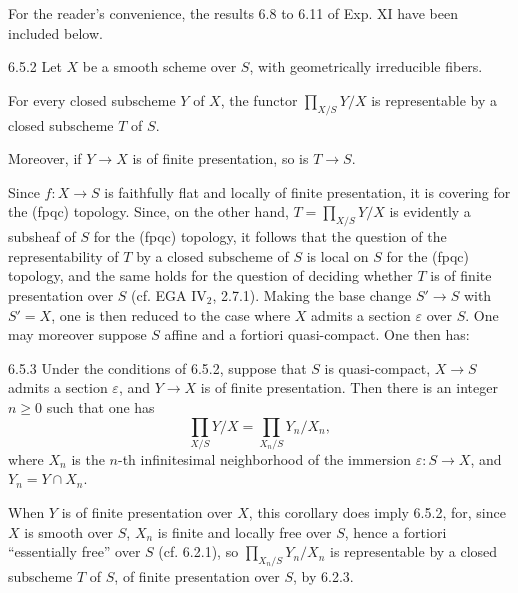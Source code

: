 For the reader's convenience, the results 6.8 to 6.11 of Exp. XI have been included below.
\begin{theorem}{6.5.2}\label{VIB.6.5.2}
Let $X$ be a smooth scheme over $S$, with geometrically irreducible fibers.
\begin{enumeratei}
\item For every closed subscheme $Y$ of $X$, the functor $\prod_{X/S}Y/X$ is representable by a closed subscheme $T$ of $S$.
\item Moreover, if $Y\to X$ is of finite presentation, so is $T\to S$.
\end{enumeratei}
\end{theorem}
Since $f:X\to S$ is faithfully flat and locally of finite presentation, it is covering for the (fpqc) topology. Since, on the other hand, $T=\prod_{X/S}Y/X$ is evidently a subsheaf of $S$ for the (fpqc) topology, it follows that the question of the representability of $T$ by a closed subscheme of $S$ is local on $S$ for the (fpqc) topology, and the same holds for the question of deciding whether $T$ is of finite presentation over $S$ (cf. EGA IV$_2$, 2.7.1). Making the base change $S'\to S$ with $S'=X$, one is then reduced to the case where $X$ admits a section $\varepsilon$ over $S$. One may moreover suppose $S$ affine and a fortiori quasi-compact. One then has:
\begin{corollary}{6.5.3}\label{VIB.6.5.3}
Under the conditions of 6.5.2, suppose that $S$ is quasi-compact, $X\to S$ admits a section $\varepsilon$, and $Y\to X$ is of finite presentation. Then there is an integer $n\ge0$ such that one has
\[
\prod_{X/S}Y/X=\prod_{X_n/S}Y_n/X_n,
\]
where $X_n$ is the $n$-th infinitesimal neighborhood of the immersion $\varepsilon:S\to X$, and $Y_n=Y\cap X_n$.
\end{corollary}
When $Y$ is of finite presentation over $X$, this corollary does imply 6.5.2, for, since $X$ is smooth over $S$, $X_n$ is finite and locally free over $S$, hence a fortiori ``essentially free'' over $S$ (cf. 6.2.1), so $\prod_{X_n/S}Y_n/X_n$ is representable by a closed subscheme $T$ of $S$, of finite presentation over $S$, by 6.2.3.

